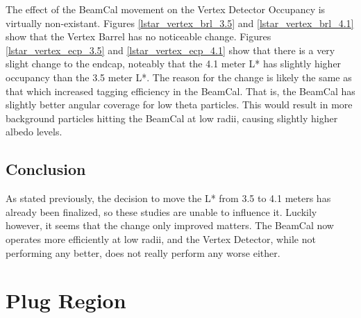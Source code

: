 \documentclass{report}
\begin{document}
                The effect of the BeamCal movement on the Vertex Detector Occupancy is virtually non-existant. Figures \ref{lstar_vertex_brl_3.5} and \ref{lstar_vertex_brl_4.1} show that the Vertex Barrel has no noticeable change. Figures \ref{lstar_vertex_ecp_3.5} and \ref{lstar_vertex_ecp_4.1} show that there is a very slight change to the endcap, noteably that the 4.1 meter L* has slightly higher occupancy than the 3.5 meter L*. The reason for the change is likely the same as that which increased tagging efficiency in the BeamCal. That is, the BeamCal has slightly better angular coverage for low theta particles. This would result in more background particles hitting the BeamCal at low radii, causing slightly higher albedo levels.

            \subsection{Conclusion}
                As stated previously, the decision to move the L* from 3.5 to 4.1 meters has already been finalized, so these studies are unable to influence it. Luckily however, it seems that the change only improved matters. The BeamCal now operates more efficiently at low radii, and the Vertex Detector, while not performing any better, does not really perform any worse either.


        \section{Plug Region}
\end{document}
